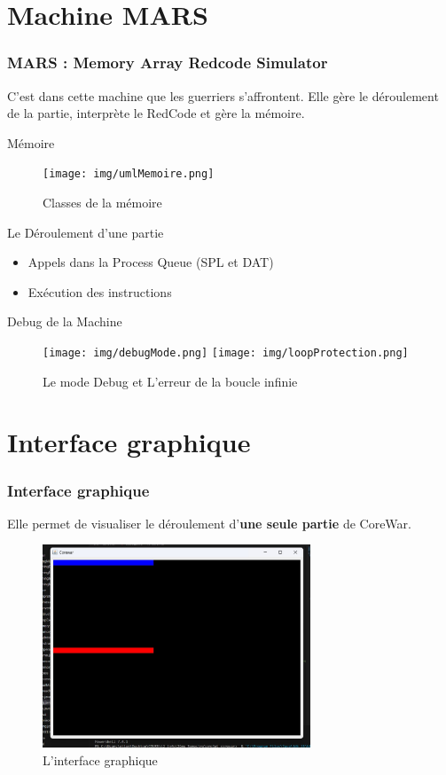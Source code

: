 \documentclass{beamer}
\begin{document}
\section{Machine MARS}
\begin{frame}
    \frametitle{MARS : Memory Array Redcode Simulator}
    C'est dans cette machine que les guerriers s'affrontent. Elle gère le déroulement de la partie, interprète le RedCode et gère la mémoire.
\end{frame}


\begin{frame}{Mémoire}
    \begin{figure}
        \centering
        \texttt{[image: img/umlMemoire.png]}
        \caption{Classes de la mémoire}
    \end{figure}
\end{frame}

\begin{frame}{Le Déroulement d'une partie}
    \begin{itemize}
        \item Appels dans la Process Queue (SPL et DAT)
        \item Exécution des instructions
    \end{itemize}
\end{frame}

\begin{frame}{Debug de la Machine}
    \begin{figure}
        \centering
        \texttt{[image: img/debugMode.png]}
        \hfill
        \texttt{[image: img/loopProtection.png]}
        \caption{Le mode Debug et L'erreur de la boucle infinie}
    \end{figure}
\end{frame}

\section{Interface graphique}
\begin{frame}
    \frametitle{Interface graphique}
    Elle permet de visualiser le déroulement d'\textbf{une seule partie} de CoreWar.
    \begin{figure}
        \centering
        \includegraphics[width = 8cm]{img/display.jpg}
        \caption{L'interface graphique}
    \end{figure}
\vspace{-5.5pt}
\end{frame}
\end{document}
